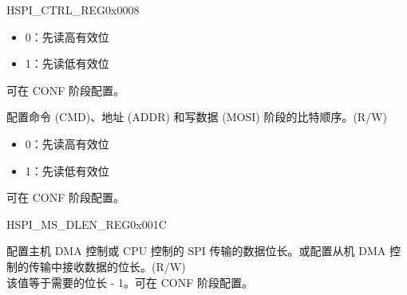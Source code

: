 \begin{register}{H}{SPI\_CTRL\_REG}{0x0008}
\begin{regdesc}
\begin{reglist}
\begin{itemize}
    \item 0：先读高有效位
    \item 1：先读低有效位
\end{itemize}
可在 CONF 阶段配置。
\label{fielddesc:SPIWRBITORDER}\item [SPI\_WR\_BIT\_ORDER] 配置命令 (CMD)、地址 (ADDR) 和写数据 (MOSI) 阶段的比特顺序。(R/W)\\
\begin{itemize}
    \item 0：先读高有效位
    \item 1：先读低有效位
\end{itemize}
可在 CONF 阶段配置。
\end{reglist}\end{regdesc}
\end{register}


\begin{register}{H}{SPI\_MS\_DLEN\_REG}{0x001C}\label{regdesc:SPIMSDLENREG}
%
%
\regnewline%
\begin{regdesc}\begin{reglist}
\label{fielddesc:SPIMSDATABITLEN}\item [SPI\_MS\_DATA\_BITLEN] 配置主机 DMA 控制或 CPU 控制的 SPI 传输的数据位长。或配置从机 DMA 控制的传输中接收数据的位长。(R/W)\\
该值等于需要的位长 - 1。可在 CONF 阶段配置。 
\end{reglist}\end{regdesc}
\end{register}


